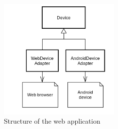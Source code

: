 \begin{figure}[h!]
	\centering
    \includegraphics[width=60mm,natwidth=400,natheight=300]{./img/androidwebuml.png}
    \caption{Structure of the web application}
	\label{fig:nativewebuml}
\end{figure}

